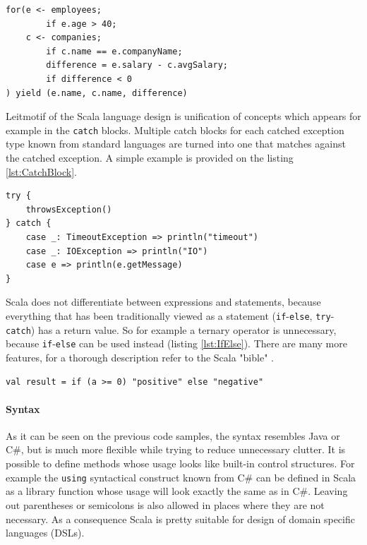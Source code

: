 \documentclass[12pt,a4paper]{report}
\begin{document}
\begin{minipage}{\linewidth}
\begin{lstlisting}[caption={For comprehension example.},label={lst:ForComprehension}]
for(e <- employees;
        if e.age > 40;
    c <- companies;
        if c.name == e.companyName;
        difference = e.salary - c.avgSalary;
        if difference < 0		
) yield (e.name, c.name, difference)
\end{lstlisting}
\end{minipage}

Leitmotif of the Scala language design is unification of concepts which appears for example in the \texttt{catch} blocks. Multiple catch blocks for each catched exception type known from standard languages are turned into one that matches against the catched exception. A simple example is provided on the listing \ref{lst:CatchBlock}.

\begin{minipage}{\linewidth}
\begin{lstlisting}[caption={Catch block example.},label={lst:CatchBlock}]
try {
    throwsException()
} catch {
    case _: TimeoutException => println("timeout")
    case _: IOException => println("IO")
    case e => println(e.getMessage)
}
\end{lstlisting}
\end{minipage}

Scala does not differentiate between expressions and statements, because everything that has been traditionally viewed as a statement (\texttt{if}-\texttt{else}, \texttt{try}-\texttt{catch}) has a return value. So for example a ternary operator is unnecessary, because \texttt{if}-\texttt{else} can be used instead (listing \ref{lst:IfElse}). There are many more features, for a thorough description refer to the Scala "bible" \cite{ScalaProgramming}.

\begin{minipage}{\linewidth}
\begin{lstlisting}[caption={\texttt{If}-\texttt{else} as a ternary operator.},label={lst:IfElse}]
val result = if (a >= 0) "positive" else "negative"
\end{lstlisting}
\end{minipage}

\paragraph{Syntax} As it can be seen on the previous code samples, the syntax resembles Java or C\#, but is much more flexible while trying to reduce unnecessary clutter. It is possible to define methods whose usage looks like built-in control structures. For example the \texttt{using} syntactical construct known from C\# can be defined in Scala as a library function whose usage will look exactly the same as in C\#. Leaving out parentheses or semicolons is also allowed in places where they are not necessary. As a consequence Scala is pretty suitable for design of domain specific languages (DSLs). 
\end{document}
